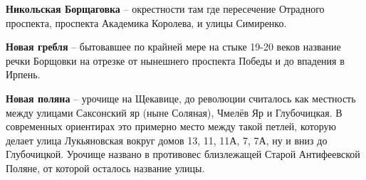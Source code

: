 \medskip

\textbf{Никольская Борщаговка} – окрестности там где пересечение Отрадного проспекта, проспекта Академика Королева, и улицы Симиренко.\\

\medskip

\textbf{Новая гребля} – бытовавшее по крайней мере на стыке 19-20 веков название речки Борщовки на отрезке от нынешнего проспекта Победы и до впадения в Ирпень.\\

\medskip

\textbf{Новая поляна} – урочище на Щекавице, до революции считалось как местность между улицами Саксонский яр (ныне Соляная), Чмелёв Яр и Глубочицкая. В современных ориентирах это примерно место между такой петлей, которую делает улица Лукьяновская вокруг домов 13, 11, 11А, 7, 7А, ну и вниз до Глубочицкой. Урочище названо в противовес близлежащей Старой Антифеевской Поляне, от которой осталось название улицы.\\


